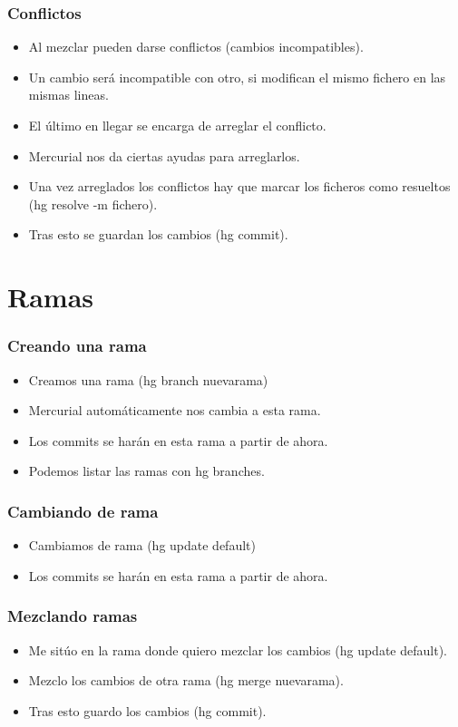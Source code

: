 \documentclass[10pt]{beamer}
\begin{document}
  \begin{frame}[containsverbatim]
    \frametitle{Conflictos}
    \begin{itemize}
      \item Al mezclar pueden darse conflictos (cambios incompatibles).
      \item Un cambio será incompatible con otro, si modifican el mismo fichero en las mismas lineas.
      \item El último en llegar se encarga de arreglar el conflicto.
      \item Mercurial nos da ciertas ayudas para arreglarlos.
      \item Una vez arreglados los conflictos hay que marcar los ficheros como resueltos (hg resolve -m fichero).
      \item Tras esto se guardan los cambios (hg commit).
    \end{itemize}
  \end{frame}

  \section*{Ramas}

  \begin{frame}[containsverbatim]
    \frametitle{Creando una rama}
    \begin{itemize}
      \item Creamos una rama (hg branch nuevarama)
      \item Mercurial automáticamente nos cambia a esta rama.
      \item Los commits se harán en esta rama a partir de ahora.
      \item Podemos listar las ramas con hg branches.
    \end{itemize}
  \end{frame}

  \begin{frame}[containsverbatim]
    \frametitle{Cambiando de rama}
    \begin{itemize}
      \item Cambiamos de rama (hg update default)
      \item Los commits se harán en esta rama a partir de ahora.
    \end{itemize}
  \end{frame}

  \begin{frame}[containsverbatim]
    \frametitle{Mezclando ramas}
    \begin{itemize}
      \item Me sitúo en la rama donde quiero mezclar los cambios (hg update default).
      \item Mezclo los cambios de otra rama (hg merge nuevarama).
      \item Tras esto guardo los cambios (hg commit).
    \end{itemize}
  \end{frame}
\end{document}
